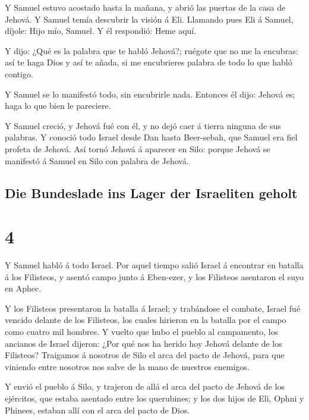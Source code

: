  Y Samuel estuvo acostado hasta la mañana, y abrió las
puertas de la casa de Jehová. Y Samuel temía descubrir la visión á Eli.
 Llamando pues Eli á Samuel, díjole: Hijo mío, Samuel. Y
él respondió: Heme aquí.

 Y dijo: ¿Qué es la palabra que te habló Jehová?; ruégote
que no me la encubras: así te haga Dios y así te añada, si me
encubrieres palabra de todo lo que habló contigo.

 Y Samuel se lo manifestó todo, sin encubrirle nada.
Entonces él dijo: Jehová es; haga lo que bien le pareciere.

 Y Samuel creció, y Jehová fué con él, y no dejó caer á
tierra ninguna de sus palabras.  Y conoció todo Israel
desde Dan hasta Beer-sebah, que Samuel era fiel profeta de Jehová.
 Así tornó Jehová á aparecer en Silo: porque Jehová se
manifestó á Samuel en Silo con palabra de Jehová.

\hypertarget{die-bundeslade-ins-lager-der-israeliten-geholt}{%
\subsection{Die Bundeslade ins Lager der Israeliten
geholt}\label{die-bundeslade-ins-lager-der-israeliten-geholt}}

\hypertarget{section-3}{%
\section{4}\label{section-3}}

 Y Samuel habló á todo Israel. Por aquel tiempo salió
Israel á encontrar en batalla á los Filisteos, y asentó campo junto á
Eben-ezer, y los Filisteos asentaron el suyo en Aphec.

 Y los Filisteos presentaron la batalla á Israel; y
trabándose el combate, Israel fué vencido delante de los Filisteos, los
cuales hirieron en la batalla por el campo como cuatro mil hombres.
 Y vuelto que hubo el pueblo al campamento, los ancianos
de Israel dijeron: ¿Por qué nos ha herido hoy Jehová delante de los
Filisteos? Traigamos á nosotros de Silo el arca del pacto de Jehová,
para que viniendo entre nosotros nos salve de la mano de nuestros
enemigos.

 Y envió el pueblo á Silo, y trajeron de allá el arca del
pacto de Jehová de los ejércitos, que estaba asentado entre los
querubines; y los dos hijos de Eli, Ophni y Phinees, estaban allí con el
arca del pacto de Dios.

